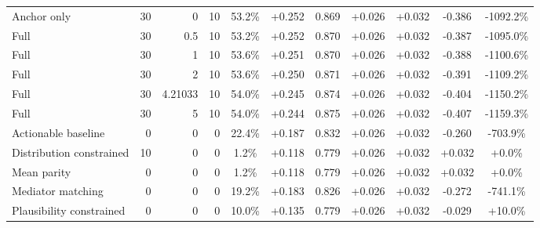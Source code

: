 \begin{table}[htbp]
\begin{tabular}{lrrrccccccc}
Anchor only & 30 & 0 & 10 & 53.2\% & +0.252 & 0.869 & +0.026 & +0.032 & -0.386 & -1092.2\% \\
Full & 30 & 0.5 & 10 & 53.2\% & +0.252 & 0.870 & +0.026 & +0.032 & -0.387 & -1095.0\% \\
Full & 30 & 1 & 10 & 53.6\% & +0.251 & 0.870 & +0.026 & +0.032 & -0.388 & -1100.6\% \\
Full & 30 & 2 & 10 & 53.6\% & +0.250 & 0.871 & +0.026 & +0.032 & -0.391 & -1109.2\% \\
Full & 30 & 4.21033 & 10 & 54.0\% & +0.245 & 0.874 & +0.026 & +0.032 & -0.404 & -1150.2\% \\
Full & 30 & 5 & 10 & 54.0\% & +0.244 & 0.875 & +0.026 & +0.032 & -0.407 & -1159.3\% \\
Actionable baseline & 0 & 0 & 0 & 22.4\% & +0.187 & 0.832 & +0.026 & +0.032 & -0.260 & -703.9\% \\
Distribution constrained & 10 & 0 & 0 & 1.2\% & +0.118 & 0.779 & +0.026 & +0.032 & +0.032 & +0.0\% \\
Mean parity & 0 & 0 & 0 & 1.2\% & +0.118 & 0.779 & +0.026 & +0.032 & +0.032 & +0.0\% \\
Mediator matching & 0 & 0 & 0 & 19.2\% & +0.183 & 0.826 & +0.026 & +0.032 & -0.272 & -741.1\% \\
Plausibility constrained & 0 & 0 & 0 & 10.0\% & +0.135 & 0.779 & +0.026 & +0.032 & -0.029 & +10.0\% \\
\bottomrule
\end{tabular}
\end{table}